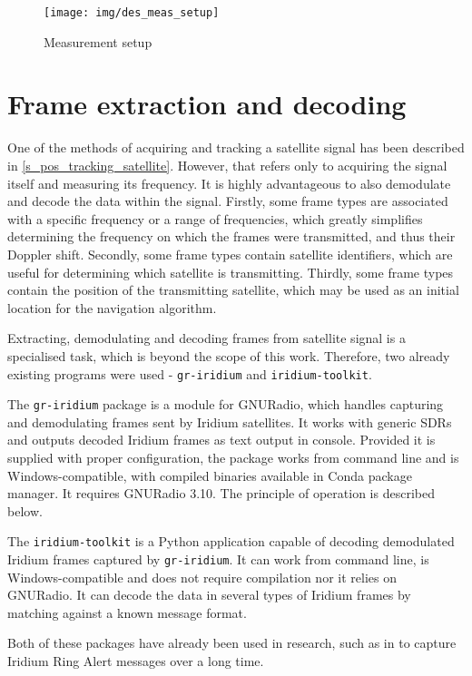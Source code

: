 \begin{figure}
    \centering
    \texttt{[image: img/des\_meas\_setup]}
    \caption{Measurement setup}
    \label{f_des_meas_setup}
\end{figure}


\section{Frame extraction and decoding}
One of the methods of acquiring and tracking a satellite signal has been described in \autoref{s_pos_tracking_satellite}. However, that refers only to acquiring the signal itself and measuring its frequency. It is highly advantageous to also demodulate and decode the data within the signal. Firstly, some frame types are associated with a specific frequency or a range of frequencies, which greatly simplifies determining the frequency on which the frames were transmitted, and thus their Doppler shift. Secondly, some frame types contain satellite identifiers, which are useful for determining which satellite is transmitting. Thirdly, some frame types contain the position of the transmitting satellite, which may be used as an initial location for the navigation algorithm.

Extracting, demodulating and decoding frames from satellite signal is a specialised task, which is beyond the scope of this work. Therefore, two already existing programs were used - \texttt{gr-iridium}\cite{des09} and \texttt{iridium-toolkit}\cite{des10}.

The \texttt{gr-iridium} package is a module for GNURadio, which handles capturing and demodulating frames sent by Iridium satellites. It works with generic SDRs and outputs decoded Iridium frames as text output in console. Provided it is supplied with proper configuration, the package works from command line and is Windows-compatible, with compiled binaries available in Conda package manager. It requires GNURadio 3.10. The principle of operation is described below.
 
The \texttt{iridium-toolkit} is a Python application capable of decoding demodulated Iridium frames captured by \texttt{gr-iridium}. It can work from command line, is Windows-compatible and does not require compilation nor it relies on GNURadio. It can decode the data in several types of Iridium frames by matching against a known message format.

Both of these packages have already been used in research, such as in \cite{sat08} to capture Iridium Ring Alert messages over a long time.

